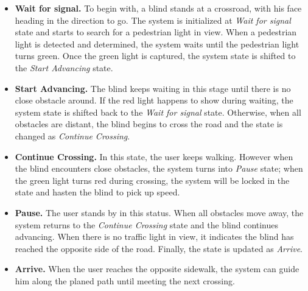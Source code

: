 \begin{itemize}
\item \textbf{Wait for signal.} To begin with, a blind stands at a crossroad, with his face heading in the direction to go. The system is initialized at \emph{Wait for signal} state and starts to search for a pedestrian light in view. When a pedestrian light is detected and determined, the system waits until the pedestrian light turns green. Once the green light is captured, the system state is shifted to the \emph{Start Advancing} state.

\item \textbf{Start Advancing.} The blind keeps waiting in this stage until there is no close obstacle around. If the red light happens to show during waiting, the system state is shifted back to the \emph{Wait for signal} state. Otherwise, when all obstacles are distant, the blind begins to cross the road and the state is changed as \emph{Continue Crossing}. 

\item \textbf{Continue Crossing.} In this state, the user keeps walking. However when the blind encounters close obstacles, the system turns into \emph{Pause} state; when  the green light turns red during crossing, the system will be locked in the state and hasten the blind to pick up speed. 


\item \textbf{Pause.} The user stands by in this status. When all obstacles move away, the system returns to the \emph{Continue Crossing} state and the blind continues advancing. When there is no traffic light in view, it indicates the blind has reached the opposite side of the road. Finally, the state is updated as \emph{Arrive}.

\item \textbf{Arrive.} When the user reaches the opposite sidewalk, the system can guide him along the planed path until meeting the next crossing. 
\end{itemize}



